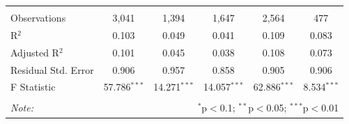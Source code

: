 \documentclass[12pt,a4paper]{article}
\begin{document}
\begin{table}[!htbp]
\begin{tabular}{@{\extracolsep{5pt}}lccccc}
  & & & & & \\ 
\hline \\[-1.8ex] 
Observations & 3,041 & 1,394 & 1,647 & 2,564 & 477 \\ 
R$^{2}$ & 0.103 & 0.049 & 0.041 & 0.109 & 0.083 \\ 
Adjusted R$^{2}$ & 0.101 & 0.045 & 0.038 & 0.108 & 0.073 \\ 
Residual Std. Error & 0.906 & 0.957 & 0.858 & 0.905 & 0.906 \\ 
F Statistic & 57.786$^{***}$ & 14.271$^{***}$ & 14.057$^{***}$ & 62.886$^{***}$ & 8.534$^{***}$ \\ 
\hline 
\hline \\[-1.8ex] 
\textit{Note:}  & \multicolumn{5}{r}{$^{*}$p$<$0.1; $^{**}$p$<$0.05; $^{***}$p$<$0.01} \\ 
\end{tabular} 
\end{table} 

\newpage
\end{document}
